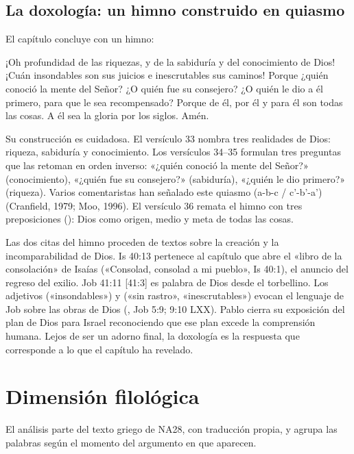 \subsection{La doxología: un himno construido en quiasmo}
El capítulo concluye con un himno:
\begin{cita}¡Oh profundidad de las riquezas, y de la sabiduría y del conocimiento de Dios! ¡Cuán insondables son sus juicios e inescrutables sus caminos! Porque ¿quién conoció la mente del Señor? ¿O quién fue su consejero? ¿O quién le dio a él primero, para que le sea recompensado? Porque de él, por él y para él son todas las cosas. A él sea la gloria por los siglos. Amén.\end{cita}
Su construcción es cuidadosa. El versículo 33 nombra tres realidades de Dios: riqueza, sabiduría y conocimiento. Los versículos 34--35 formulan tres preguntas que las retoman en orden inverso: «¿quién conoció la mente del Señor?» (conocimiento), «¿quién fue su consejero?» (sabiduría), «¿quién le dio primero?» (riqueza). Varios comentaristas han señalado este quiasmo (a-b-c / c'-b'-a') (Cranfield, 1979; Moo, 1996). El versículo 36 remata el himno con tres preposiciones (): Dios como origen, medio y meta de todas las cosas.

Las dos citas del himno proceden de textos sobre la creación y la incomparabilidad de Dios. Is 40:13 pertenece al capítulo que abre el «libro de la consolación» de Isaías («Consolad, consolad a mi pueblo», Is 40:1), el anuncio del regreso del exilio. Job 41:11 [41:3] es palabra de Dios desde el torbellino. Los adjetivos  («insondables») y  («sin rastro», «inescrutables») evocan el lenguaje de Job sobre las obras de Dios (, Job 5:9; 9:10 LXX). Pablo cierra su exposición del plan de Dios para Israel reconociendo que ese plan excede la comprensión humana. Lejos de ser un adorno final, la doxología es la respuesta que corresponde a lo que el capítulo ha revelado.

\section{Dimensión filológica}\label{sec:filologica}

El análisis parte del texto griego de NA28, con traducción propia, y agrupa las palabras según el momento del argumento en que aparecen.

